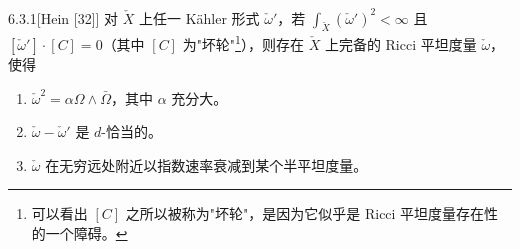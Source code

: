 \begin{theorem}{6.3.1}[Hein {[32]}]
对 $\check X$ 上任一 Kähler 形式 $\check\omega'$，若 $\int_{\check X}(\check\omega')^2<\infty$ 且 $[\check\omega']\cdot[C]=0$（其中 $[C]$ 为"坏轮"\footnote{可以看出 $[C]$ 之所以被称为"坏轮"，是因为它似乎是 Ricci 平坦度量存在性的一个障碍。}），则存在 $\check X$ 上完备的 Ricci 平坦度量 $\check\omega$，使得
\begin{enumerate}
\item[(1)] $\check\omega^2=\alpha\Omega\wedge\bar\Omega$，其中 $\alpha$ 充分大。
\item[(2)] $\check\omega-\check\omega'$ 是 $d$-恰当的。
\item[(3)] $\check\omega$ 在无穷远处附近以指数速率衰减到某个半平坦度量。
\end{enumerate}
\end{theorem}

